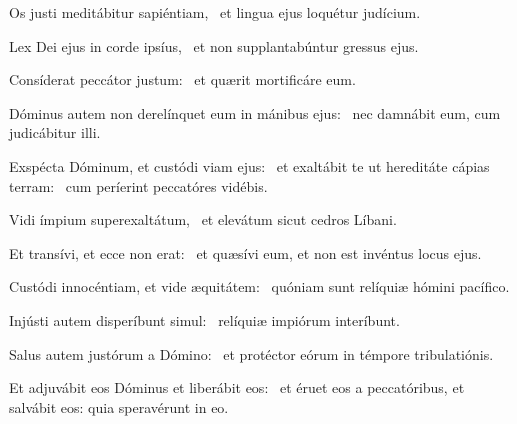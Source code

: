 
\item Os justi meditábitur sapiéntiam,~\psstar{} et lingua ejus loquétur judícium.

\item Lex Dei ejus in corde ipsíus,~\psstar{} et non supplantabúntur gressus ejus.

\item Consíderat peccátor justum:~\psstar{} et quærit mortificáre eum.

\item Dóminus autem non derelínquet eum in mánibus ejus:~\psstar{} nec damnábit eum, cum judicábitur illi.

\item Exspécta Dóminum, et custódi viam ejus:~\pscross{} et exaltábit te ut hereditáte cápias terram:~\psstar{} cum períerint peccatóres vidébis.

\item Vidi ímpium superexaltátum,~\psstar{} et elevátum sicut cedros Líbani.

\item Et transívi, et ecce non erat:~\psstar{} et quæsívi eum, et non est invéntus locus ejus.

\item Custódi innocéntiam, et vide æquitátem:~\psstar{} quóniam sunt relíquiæ hómini pacífico.

\item Injústi autem disperíbunt simul:~\psstar{} relíquiæ impiórum interíbunt.

\item Salus autem justórum a Dómino:~\psstar{} et protéctor eórum in témpore tribulatiónis.

\item Et adjuvábit eos Dóminus et liberábit eos:~\psstar{} et éruet eos a peccatóribus, et salvábit eos: quia speravérunt in eo.